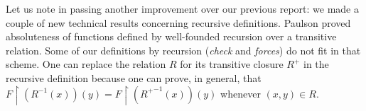 Let us note in passing another improvement over our previous report:
we made a couple of new technical results concerning recursive
definitions. Paulson proved absoluteness of functions defined by
well-founded recursion over a transitive relation. Some of our
definitions by recursion (\emph{check} and \emph{forces}) do not fit
in that scheme.  One can replace the relation $R$ for its transitive
closure $R^+$ in the recursive definition because one can prove, in
general, that
$F\!\upharpoonright\!(R^{-1}(x))(y) =
F\!\upharpoonright\!({R^+}^{-1}(x))(y)$ whenever $(x,y) \in R$.


